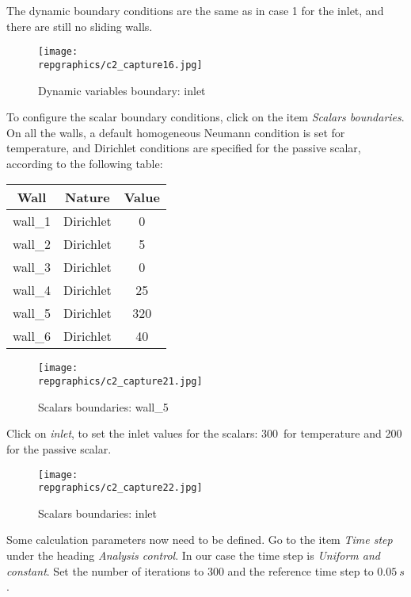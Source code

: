 \newpage
The dynamic boundary conditions are the same as in case 1 for the inlet, and
there are still no sliding walls.


\begin{figure}[h!]
\begin{center}
\texttt{[image: \\repgraphics/c2\_capture16.jpg]}
\caption{Dynamic variables boundary: inlet}
\label{fig16_e2}
\end{center}
\end{figure}


\newpage
To configure the scalar boundary conditions, click on the item
{\itshape Scalars boundaries}.
On all the walls, a default homogeneous Neumann condition is set for
temperature, and Dirichlet conditions are specified for the passive scalar,
according to the following table:
\begin{center}
\begin{tabular}{|c|c|c|}
\hline
Wall & Nature & Value \\
\hline
wall\_1 & Dirichlet  & 0 \\
\hline
wall\_2 & Dirichlet  & 5 \\
\hline
wall\_3 & Dirichlet  & 0 \\
\hline
wall\_4 & Dirichlet  & 25 \\
\hline
wall\_5 & Dirichlet  & 320 \\
\hline
wall\_6 & Dirichlet  & 40 \\
\hline
\end{tabular}
\end{center}

\begin{figure}[h!]
\begin{center}
\texttt{[image: \\repgraphics/c2\_capture21.jpg]}
\caption{Scalars boundaries: wall\_5}
\label{fig21_e2}
\end{center}
\end{figure}


\newpage
Click on {\itshape inlet}, to set the inlet values for the scalars: 300\degresC\
for temperature and 200 for the passive scalar.

\begin{figure}[h!]
\begin{center}
\texttt{[image: \\repgraphics/c2\_capture22.jpg]}
\caption{Scalars boundaries: inlet}
\label{fig22_e2}
\end{center}
\end{figure}


\newpage
Some calculation parameters now need to be defined.
Go to the item {\itshape Time step} under the heading
{\itshape Analysis control}. In our case the time step is
{\itshape Uniform and constant}. Set the number of iterations to 300 and the
reference time step to $0.05\ s$.

